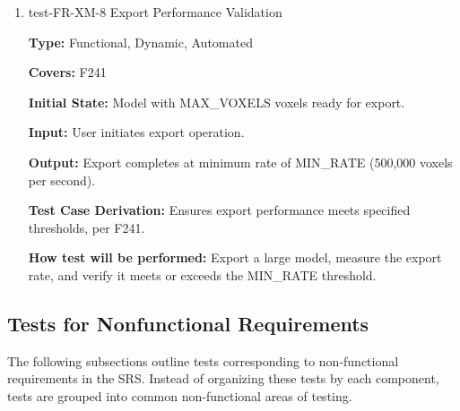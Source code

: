 \documentclass[12pt, titlepage]{article}
\begin{document}
\begin{enumerate}
\item{test-FR-XM-8 Export Performance Validation\\}
\label{sec:t-xm-8}

\textbf{Type:} Functional, Dynamic, Automated

\textbf{Covers:} F241
					
\textbf{Initial State:} Model with MAX\_VOXELS voxels ready for export.
					
\textbf{Input:} User initiates export operation.
					
\textbf{Output:} Export completes at minimum rate of MIN\_RATE (500,000 voxels per second).

\textbf{Test Case Derivation:} Ensures export performance meets specified thresholds, per F241.
					
\textbf{How test will be performed:} Export a large model, measure the export rate, and verify it meets or exceeds the MIN\_RATE threshold.

\end{enumerate}

\subsection{Tests for Nonfunctional Requirements}

\noindent The following subsections outline tests corresponding to non-functional requirements in the SRS. Instead of organizing these tests by each component, tests are grouped into common non-functional areas of testing.\\
\end{document}
